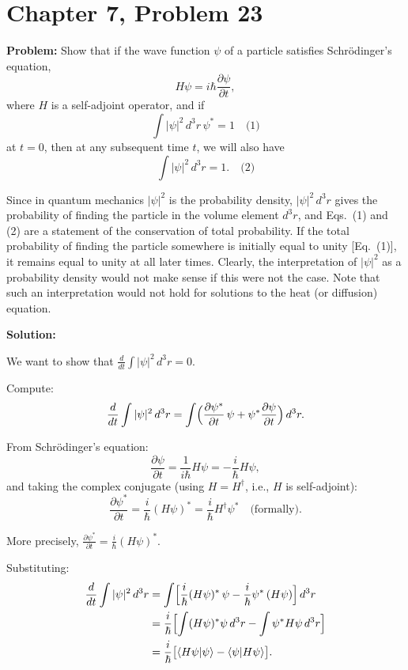 \documentclass[12pt]{article}
\begin{document}
\section*{Chapter 7, Problem 23}

\textbf{Problem:} Show that if the wave function $\psi$ of a particle satisfies Schr\"odinger's equation,
\[
H\psi = i\hbar\frac{\partial\psi}{\partial t},
\]
where $H$ is a self-adjoint operator, and if
\[
\int |\psi|^2\,d^3r\,\psi^* = 1 \quad \text{(1)}
\]
at $t = 0$, then at any subsequent time $t$, we will also have
\[
\int |\psi|^2\,d^3r = 1. \quad \text{(2)}
\]

Since in quantum mechanics $|\psi|^2$ is the probability density, $|\psi|^2\,d^3r$ gives the probability of finding the particle in the volume element $d^3r$, and Eqs.\ (1) and (2) are a statement of the conservation of total probability. If the total probability of finding the particle somewhere is initially equal to unity [Eq.\ (1)], it remains equal to unity at all later times. Clearly, the interpretation of $|\psi|^2$ as a probability density would not make sense if this were not the case. Note that such an interpretation would not hold for solutions to the heat (or diffusion) equation.

\bigskip
\textbf{Solution:}

We want to show that $\frac{d}{dt}\int|\psi|^2\,d^3r = 0$.

Compute:
\[
\frac{d}{dt}\int|\psi|^2\,d^3r = \int\Bigl(\frac{\partial\psi^*}{\partial t}\,\psi + \psi^*\frac{\partial\psi}{\partial t}\Bigr)\,d^3r.
\]

From Schr\"odinger's equation:
\[
\frac{\partial\psi}{\partial t} = \frac{1}{i\hbar}H\psi = -\frac{i}{\hbar}H\psi,
\]
and taking the complex conjugate (using $H = H^\dagger$, i.e., $H$ is self-adjoint):
\[
\frac{\partial\psi^*}{\partial t} = \frac{i}{\hbar}(H\psi)^* = \frac{i}{\hbar}H^\dagger\psi^* \quad\text{(formally)}.
\]

More precisely, $\frac{\partial\psi^*}{\partial t} = \frac{i}{\hbar}(H\psi)^*$.

Substituting:
\begin{align}
\frac{d}{dt}\int|\psi|^2\,d^3r &= \int\Bigl[\frac{i}{\hbar}(H\psi)^*\,\psi - \frac{i}{\hbar}\psi^*\,(H\psi)\Bigr]\,d^3r \\
&= \frac{i}{\hbar}\Bigl[\int(H\psi)^*\psi\,d^3r - \int\psi^*H\psi\,d^3r\Bigr] \\
&= \frac{i}{\hbar}\bigl[\langle H\psi|\psi\rangle - \langle\psi|H\psi\rangle\bigr].
\end{align}
\end{document}
